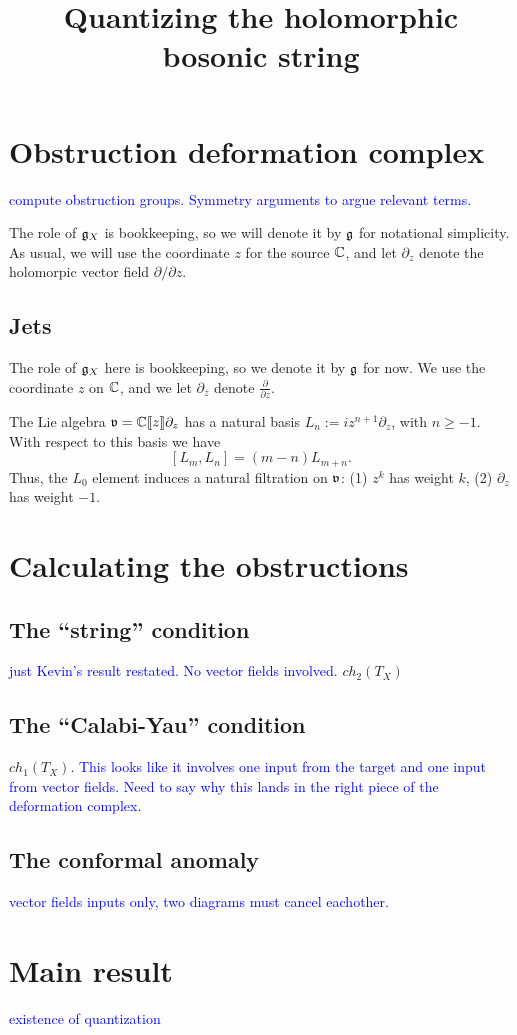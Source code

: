 \documentclass[10pt]{amsart}
\title{Quantizing the holomorphic bosonic string}
\def\brian{\textcolor{blue}}
\begin{document}
\maketitle

\section{Obstruction deformation complex}
\brian{compute obstruction groups. Symmetry arguments to argue relevant
  terms.}

The role of $\mathfrak g_X$ is bookkeeping, so we will denote it by $\mathfrak g$ for
notational simplicity. As usual, we will use the coordinate $z$ for
the source $\mathbb C$, and let $\partial_z$ denote the holomorpic vector field $\partial / \partial
z$. 

\subsection{Jets}

The role of $\mathfrak g_X$ here is bookkeeping, so we denote it by $\mathfrak g$ for
now. We use the coordinate $z$ on $\mathbb C$, and we let $\partial_z$
denote $\frac{\partial}{\partial z}$. 

The Lie algebra $\mathfrak v = \mathbb C \llbracket z \rrbracket \partial_z$ has a
natural basis $L_n := i z^{n+1} \partial_z$, with $n \geq -1$. With
respect to this basis we have
\[
[L_m,L_n] = (m-n) L_{m+n} .
\]
Thus, the $L_0$ element induces a natural filtration on $\mathfrak v$: (1) $z^k$
has weight $k$, (2) $\partial_z$ has weight $-1$. 


\section{Calculating the obstructions}
\subsection{The ``string'' condition}
\brian{just Kevin's result restated. No vector fields involved.}
$ch_2(T_X)$
\subsection{The ``Calabi-Yau'' condition}
$ch_1(T_X)$. \brian{This looks like it involves one input from the
  target and one input from vector fields. Need to say why this lands
  in the right piece of the deformation complex.}

\subsection{The conformal anomaly} 
\brian{vector fields inputs only, two diagrams must cancel eachother.
}
\section{Main result}
\brian{existence of quantization}
\end{document}
